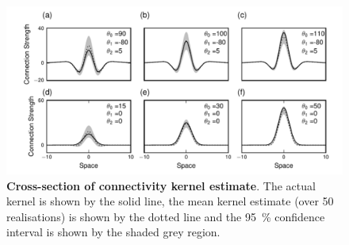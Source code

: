 \documentclass[12pt]{iopart}
\begin{document}
\begin{figure}[!ht]
\begin{center}
\includegraphics{./Graph/pdf/Figure8_1.pdf}
\end{center}
\caption{{\bf Cross-section of connectivity kernel estimate}. The actual kernel is shown by the solid line, the mean kernel estimate (over 50 realisations) is shown by the dotted line and the 95~\% confidence interval is shown by the shaded grey region.}
\label{fig:Figure8}
\end{figure}


\end{document}

